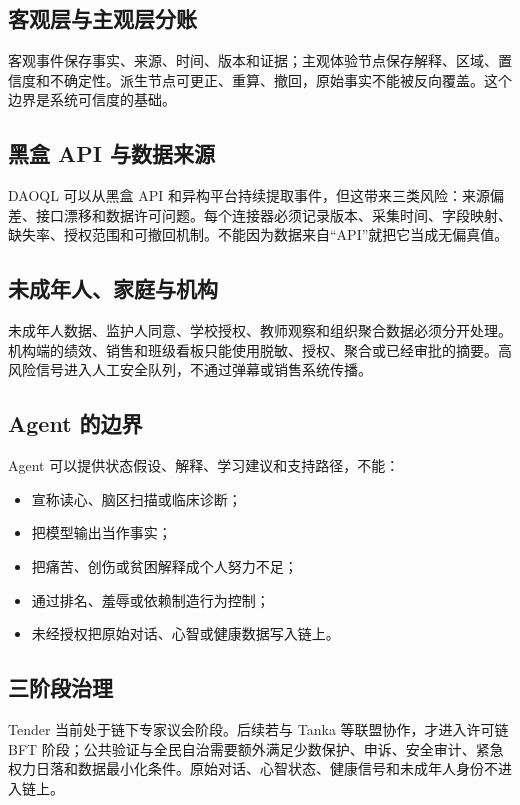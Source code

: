 \documentclass[UTF8,a4paper,11pt]{ctexart}
\begin{document}
\subsection{客观层与主观层分账}

客观事件保存事实、来源、时间、版本和证据；主观体验节点保存解释、区域、置信度和不确定性。派生节点可更正、重算、撤回，原始事实不能被反向覆盖。这个边界是系统可信度的基础。

\subsection{黑盒 API 与数据来源}

DAOQL 可以从黑盒 API 和异构平台持续提取事件，但这带来三类风险：来源偏差、接口漂移和数据许可问题。每个连接器必须记录版本、采集时间、字段映射、缺失率、授权范围和可撤回机制。不能因为数据来自“API”就把它当成无偏真值。

\subsection{未成年人、家庭与机构}

未成年人数据、监护人同意、学校授权、教师观察和组织聚合数据必须分开处理。机构端的绩效、销售和班级看板只能使用脱敏、授权、聚合或已经审批的摘要。高风险信号进入人工安全队列，不通过弹幕或销售系统传播。

\subsection{Agent 的边界}

Agent 可以提供状态假设、解释、学习建议和支持路径，不能：

\begin{itemize}
\item 宣称读心、脑区扫描或临床诊断；
\item 把模型输出当作事实；
\item 把痛苦、创伤或贫困解释成个人努力不足；
\item 通过排名、羞辱或依赖制造行为控制；
\item 未经授权把原始对话、心智或健康数据写入链上。
\end{itemize}

\subsection{三阶段治理}

Tender 当前处于链下专家议会阶段。后续若与 Tanka 等联盟协作，才进入许可链 BFT 阶段；公共验证与全民自治需要额外满足少数保护、申诉、安全审计、紧急权力日落和数据最小化条件。原始对话、心智状态、健康信号和未成年人身份不进入链上。
\end{document}
